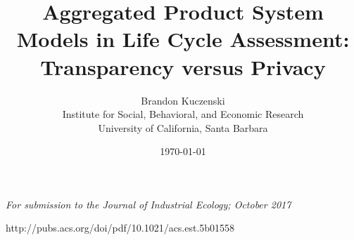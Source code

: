 \documentclass[12pt]{article}
\title{Aggregated Product System Models in Life Cycle Assessment: Transparency versus Privacy}
\author{Brandon Kuczenski\\
Institute for Social, Behavioral, and Economic Research\\
University of California, Santa Barbara}
\date{\mydate\today}
\def\mainpaper{

  \maketitle
  \emph{For submission to the Journal of Industrial Ecology; October 2017}

  

  \doublespacing

  {\red http://pubs.acs.org/doi/pdf/10.1021/acs.est.5b01558}

  
  
  
  
  
  
  


  
  


  \singlespacing
  
}
\def\supporting{
  \renewcommand{\thefigure}{S\arabic{figure}}
  \renewcommand{\thetable}{S\arabic{table}}

  \maketitle

  \begin{center}
    \Large Supporting Information
  \end{center}

  \doublespacing

  

  
  
  
  
  

  \singlespacing
}
\def\unused{
  
}
\begin{document}
\mainpaper

\end{document}

